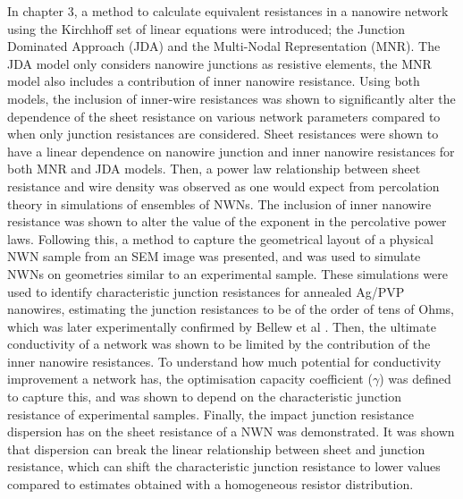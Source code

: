 
In chapter 3, a method to calculate equivalent resistances in a nanowire network using the Kirchhoff set of linear equations were introduced; the Junction Dominated Approach (JDA) and the Multi-Nodal Representation (MNR). The JDA model only considers nanowire junctions as resistive elements, the MNR model also includes a contribution of inner nanowire resistance. Using both models, the inclusion of inner-wire resistances was shown to significantly alter the dependence of the sheet resistance on various network parameters compared to when only junction resistances are considered. Sheet resistances were shown to have a linear dependence on nanowire junction and inner nanowire resistances for both MNR and JDA models. Then, a power law relationship between sheet resistance and wire density was observed as one would expect from percolation theory in simulations of ensembles of NWNs. The inclusion of inner nanowire resistance was shown to alter the value of the exponent in the percolative power laws. Following this, a method to capture the geometrical layout of a physical NWN sample from an SEM image was presented, and was used to simulate NWNs on geometries similar to an experimental sample. These simulations were used to identify characteristic junction resistances for annealed Ag/PVP nanowires, estimating the junction resistances to be of the order of tens of Ohms, which was later experimentally confirmed by Bellew et al \cite{bellew2015}. Then, the ultimate conductivity of a network was shown to be limited by the contribution of the inner nanowire resistances. To understand how much potential for conductivity improvement a network has, the optimisation capacity coefficient ($\gamma$) was defined to capture this, and was shown to depend on the characteristic junction resistance of experimental samples. Finally, the impact junction resistance dispersion has on the sheet resistance of a NWN was demonstrated. It was shown that dispersion can break the linear relationship between sheet and junction resistance, which can shift the characteristic junction resistance to lower values compared to estimates obtained with a homogeneous resistor distribution.


